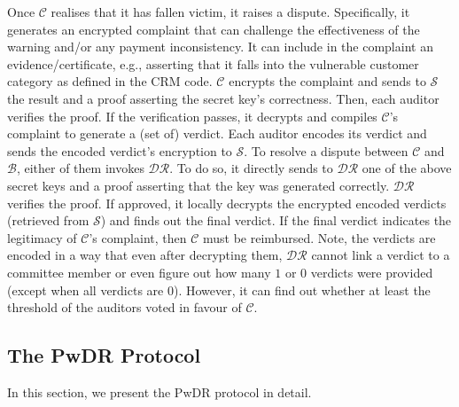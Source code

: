 

Once $\mathcal{C}$ realises that it has fallen victim, it raises a dispute. Specifically, it generates an encrypted complaint that can challenge the effectiveness of the warning and/or any payment inconsistency. It can include in the complaint an evidence/certificate, e.g., asserting that it falls into the vulnerable customer category as defined in the CRM code. $\mathcal{C}$ encrypts the complaint and sends to $\mathcal{S}$ the result and a proof asserting the secret key's correctness.  Then, each auditor verifies the proof. If the verification passes, it decrypts and compiles $\mathcal{C}$'s complaint to generate a (set of) verdict. Each auditor encodes its verdict and sends the encoded verdict's encryption to $\mathcal{S}$. To resolve a dispute between $\mathcal{C}$ and $\mathcal{B}$, either of them invokes $\mathcal{DR}$. To do so, it directly sends to $\mathcal{DR}$ one of the above secret keys and a proof asserting that the key was generated correctly.   $\mathcal{DR}$ verifies the proof. If approved, it locally decrypts the encrypted encoded verdicts (retrieved from $\mathcal{S}$) and finds out the final verdict.  If the final verdict indicates the legitimacy of  $\mathcal{C}$'s complaint, then $\mathcal{C}$ must be reimbursed.   Note, the verdicts are encoded in a way that even after decrypting them, $\mathcal{DR}$ cannot link a verdict to a committee member or even figure out how many $1$ or $0$ verdicts were provided  (except when all verdicts are $0$). However, it can find out whether at least the threshold of the auditors voted in favour of $\mathcal{C}$. %










\subsection{The PwDR Protocol}\label{sec::PwDR-auditorprotocol}
In this section, we present the PwDR protocol in detail. 


